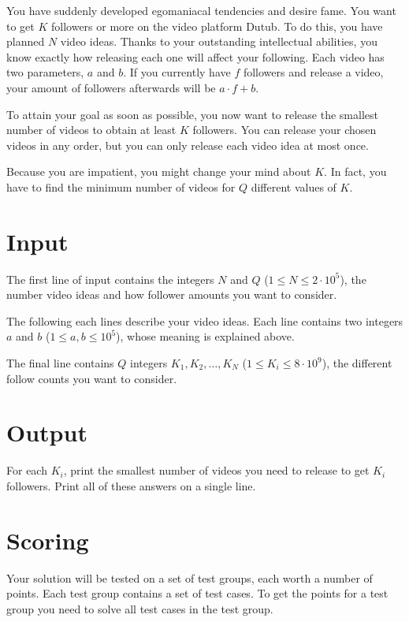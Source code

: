 
\noindent
You have suddenly developed egomaniacal tendencies and desire fame. You want to get $K$ followers or more on the video platform
Dutub. To do this, you have planned $N$ video ideas. Thanks to your outstanding intellectual abilities, you know exactly
how releasing each one will affect your following. Each video has two parameters, $a$ and $b$. If you currently have $f$ followers
and release a video, your amount of followers afterwards will be $a \cdot f + b$. 

To attain your goal as soon as possible, you now want to release the smallest number of videos to obtain at least $K$ followers.
You can release your chosen videos in any order, but you can only release each video idea at most once.

Because you are impatient, you might change your mind about $K$. In fact, you have to find the minimum number of videos
for $Q$ different values of $K$.

\section*{Input}
The first line of input contains the integers $N$ and $Q$ ($1 \le N \le 2 \cdot 10^5$), the number video ideas
and how follower amounts you want to consider.

The following each lines describe your video ideas. Each line contains two integers $a$ and $b$ ($1 \leq a, b \leq 10^5$),
whose meaning is explained above.

The final line contains $Q$ integers $K_1, K_2, \dots, K_N$ ($1 \leq K_i \leq 8 \cdot 10^9$), the different follow counts
you want to consider.

\section*{Output}
For each $K_i$, print the smallest number of videos you need to release to get $K_i$ followers.
Print all of these answers on a single line.

\section*{Scoring}
Your solution will be tested on a set of test groups, each worth a number of points. Each test group contains
a set of test cases. To get the points for a test group you need to solve all test cases in the test group.

